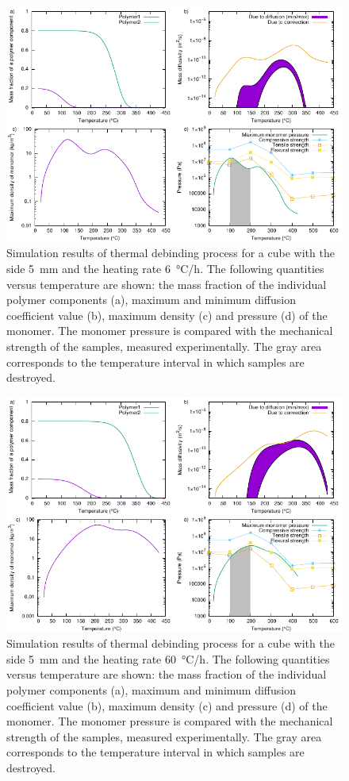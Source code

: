 \documentclass{article}
\newcommand{\ResultsCaption}[2]{
    Simulation results of thermal debinding process for a cube
    with the side \SI{#1}{\mm} and the heating rate \SI{#2}{\celsius/\hour}.
    The following quantities versus temperature are shown:
    the mass fraction of the individual polymer components (a),
    maximum and minimum diffusion coefficient value (b),
    maximum density (c) and pressure (d) of the monomer.
    The monomer pressure is compared with the mechanical strength of the samples,
    measured experimentally.
    The gray area corresponds to the temperature interval in which samples are destroyed.
}
\begin{document}
\begin{figure}
    \centering
    \includegraphics[width=\textwidth]{debinding_all_5mm_6KperHour}
    \caption{\ResultsCaption{5}{6}}
    \label{fig:debinding_all_5mm_6KperHour}
\end{figure}

\begin{figure}
    \centering
    \includegraphics[width=\textwidth]{debinding_all_5mm_60KperHour}
    \caption{\ResultsCaption{5}{60}}
    \label{fig:debinding_all_5mm_60KperHour}
\end{figure}
\end{document}
